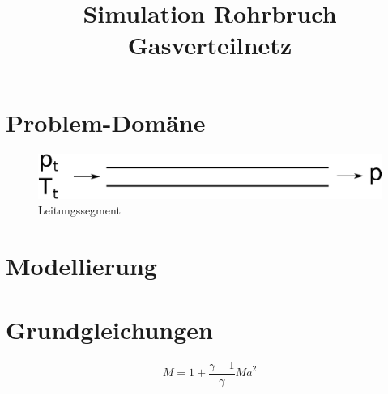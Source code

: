 \documentclass[a4paper,10pt,twocolumn]{article}
\title{Simulation Rohrbruch Gasverteilnetz}
\author{}
\date{}
\begin{document}
\maketitle

\section{Problem-Domäne}

\begin{figure}[hbp]
\centering
\includegraphics[width=0.9\hsize]{problem.eps}
\caption{Leitungssegment}
\end{figure}

\section{Modellierung}

\appendix

\section{Grundgleichungen}

\begin{equation}
M = 1 + \frac{\gamma-1}{\gamma} \mathit{Ma}^2
\end{equation}
\end{document}

